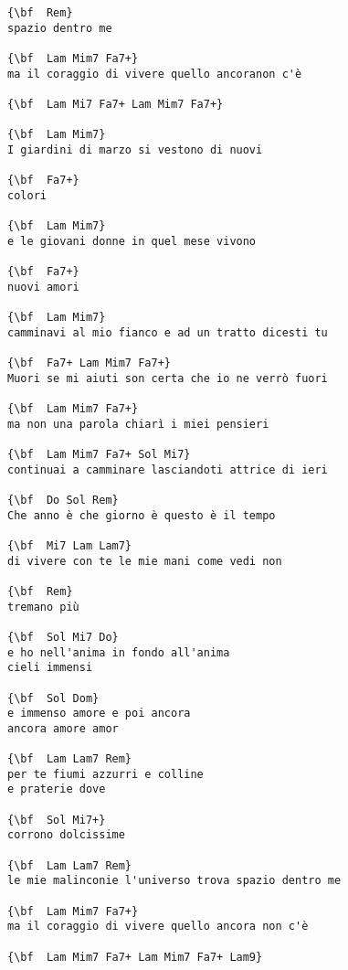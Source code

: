 \documentclass[a4paper]{article}
\begin{document}
\begin{Verbatim}[commandchars=\\\{\}]
{\bf  Rem}
spazio dentro me

{\bf  Lam Mim7 Fa7+}
ma il coraggio di vivere quello ancoranon c'è

{\bf  Lam Mi7 Fa7+ Lam Mim7 Fa7+}

{\bf  Lam Mim7}
I giardini di marzo si vestono di nuovi

{\bf  Fa7+}
colori

{\bf  Lam Mim7}
e le giovani donne in quel mese vivono

{\bf  Fa7+}
nuovi amori

{\bf  Lam Mim7}
camminavi al mio fianco e ad un tratto dicesti tu

{\bf  Fa7+ Lam Mim7 Fa7+}
Muori se mi aiuti son certa che io ne verrò fuori

{\bf  Lam Mim7 Fa7+}
ma non una parola chiarì i miei pensieri

{\bf  Lam Mim7 Fa7+ Sol Mi7}
continuai a camminare lasciandoti attrice di ieri

{\bf  Do Sol Rem}
Che anno è che giorno è questo è il tempo

{\bf  Mi7 Lam Lam7}
di vivere con te le mie mani come vedi non

{\bf  Rem}
tremano più

{\bf  Sol Mi7 Do}
e ho nell'anima in fondo all'anima
cieli immensi

{\bf  Sol Dom}
e immenso amore e poi ancora
ancora amore amor

{\bf  Lam Lam7 Rem}
per te fiumi azzurri e colline
e praterie dove

{\bf  Sol Mi7+}
corrono dolcissime

{\bf  Lam Lam7 Rem}
le mie malinconie l'universo trova spazio dentro me

{\bf  Lam Mim7 Fa7+}
ma il coraggio di vivere quello ancora non c'è

{\bf  Lam Mim7 Fa7+ Lam Mim7 Fa7+ Lam9}

\end{Verbatim}
\newpage
\end{document}
